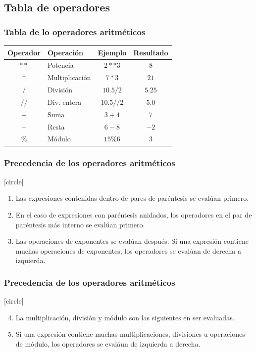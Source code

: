 \documentclass[12pt]{beamer}
\begin{document}
{\subsection{Tabla de operadores}
\begin{frame}
\frametitle{Tabla de lo operadores aritméticos}
\begin{table}
\fontsize{12}{12}\selectfont
\begin{tabular}{|c | l | c | c|}
\hline
Operador & Operación & Ejemplo & Resultado \\ \hline
$**$ & Potencia & $2**3$ & $8$ \\ \hline
$*$ & Multiplicación & $7*3$ & $21$ \\ \hline
$/$ & División & $10.5/2$ & $5.25$ \\ \hline
$ //$ & Div. entera & $10.5//2 $ & $5.0$ \\ \hline
$+$ & Suma & $3+4$ & $7$ \\ \hline
$-$ & Resta & $6-8$ & $-2$ \\ \hline
$\%$ & Módulo & $15\%6$ & $3$ \\ \hline
\end{tabular}
\end{table}
\end{frame}
\begin{frame}
\frametitle{Precedencia de los operadores aritméticos}
[circle]
\begin{enumerate}[<+->]
\item Las expresiones contenidas dentro de pares de paréntesis se evalúan primero. 
\item En el caso de expresiones con paréntesis anidados, los operadores en el par de paréntesis más interno se evalúan primero.
\item Las operaciones de exponentes se evalúan después. Si una expresión contiene muchas operaciones de exponentes, los operadores se evalúan de derecha a izquierda.
\end{enumerate}
\end{frame}
\begin{frame}
\frametitle{Precedencia de los operadores aritméticos}
[circle]
\begin{enumerate}[<+->]
\setcounter{enumi}{3}
\item La multiplicación, división y módulo son las siguientes en ser evaluadas. 
\item Si una expresión contiene muchas multiplicaciones, divisiones u operaciones de módulo, los operadores se evaláun de izquierda a derecha.

\end{enumerate}
\end{frame}}
\end{document}
